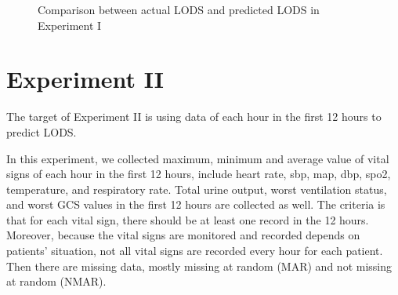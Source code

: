 \documentclass[12pt,a4paper,english
]{tunithesis}
\begin{document}
\begin{figure}
  \begin{center}
    \qquad                        
    \caption[Actual value \& Predicted value]{Comparison between actual LODS and predicted LODS in Experiment I}
    \label{fig:experiment_1_result}
  \end{center}
\end{figure}


\section{Experiment II}

The target of Experiment II is using data of each hour in the first 12 hours to predict LODS.

In this experiment, we collected maximum, minimum and average value of vital signs of each hour in the first 12 hours, include heart rate, sbp, map, dbp, spo2, temperature, and respiratory rate. Total urine output, worst ventilation status, and worst GCS values in the first 12 hours are collected as well. The criteria is that for each vital sign, there should be at least one record in the 12 hours. Moreover, because the vital signs are monitored and recorded depends on patients' situation, not all vital signs are recorded every hour for each patient. Then there are missing data, mostly missing at random (MAR) and not missing at random (NMAR). 
\end{document}
